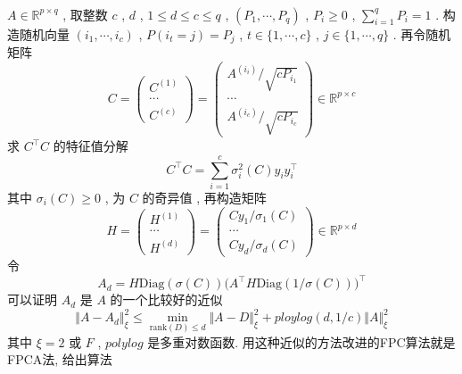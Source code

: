 \documentclass[UTF8]{ctexart}
\newcommand{\Real}[1]{\mathbb{R}^{#1}}
\numberwithin{equation}{section}
\begin{document}
		\paragraph{}
			\quad $A \in \Real{p \times q}$ , 取整数 $c$ , $d$ , $1 \le d \le c \le q$ , $(P_1, \cdots, P_q)$ , $P_i \ge 0$ , $\sum^{q}_{i = 1}P_i = 1$ . 构造随机向量 $(i_1, \cdots, i_c)$ , $P(i_t = j) = P_j$ , $t \in \{1, \cdots, c\}$ , $j \in \{1, \cdots, q\}$ . 再令随机矩阵
				\begin{equation}
					C = 
					\begin{pmatrix}
						C^{(1)} \\ \cdots \\ C^{(c)}
					\end{pmatrix}
					=
					\begin{pmatrix}
						A^{(i_i)}/\sqrt{c P_{i_1}} \\ \cdots \\ A^{(i_c)}/\sqrt{c P_{i_c}}
					\end{pmatrix}
					\in \Real{p \times c}
				\end{equation}
			求 $C ^\top C$ 的特征值分解
				\begin{equation}
					C ^\top C = \sum^{c}_{i = 1}\sigma_i^2(C) y_i y_i^\top
				\end{equation}
			其中 $\sigma_i(C) \ge 0$ , 为 $C$ 的奇异值 , 再构造矩阵
				\begin{equation}
					H = 
					\begin{pmatrix}
						H^{(1)} \\ \cdots \\ H^{(d)}
					\end{pmatrix}
					=
					\begin{pmatrix}
						Cy_1/\sigma_1(C) \\ \cdots \\ Cy_d/\sigma_d(C)
					\end{pmatrix}
					\in \Real{p \times d}
				\end{equation}
			令
				\begin{equation}
					A_d = H \text{Diag}(\sigma(C)) \big(A ^\top H \text{Diag}(1/\sigma(C))\big)^\top
				\end{equation}
			可以证明 $A_d$ 是 $A$ 的一个比较好的近似
				\begin{equation}
					\Vert{A - A_d}\Vert^2_\xi \le \min_{\text{rank}(D) \le d} \Vert{A - D}\Vert^2_\xi + ploylog(d, 1/c) \Vert{A}\Vert^2_\xi
				\end{equation}
			其中 $\xi = 2 \text{ 或 } F$ , $polylog$ 是多重对数函数. 用这种近似的方法改进的FPC算法就是FPCA法, 给出算法
\end{document}
